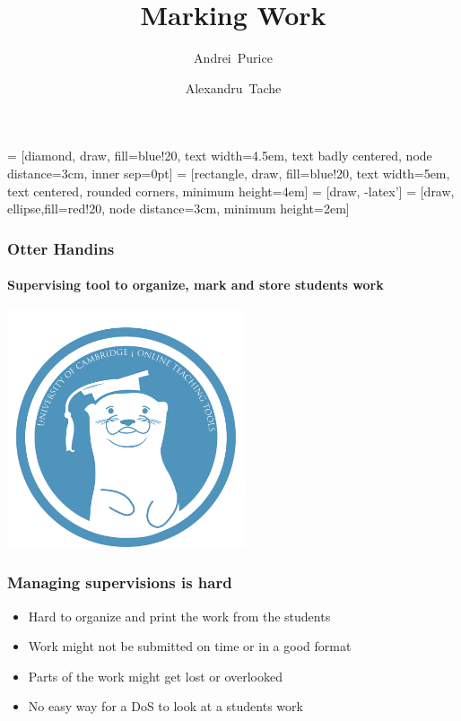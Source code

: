 \documentclass{beamer}
\title %
{Marking Work}
\author[Author, Anders] %
{Andrei~Purice \and Alexandru~Tache}
\begin{document}
   = [diamond, draw, fill=blue!20, 
      text width=4.5em, text badly centered, node distance=3cm, inner sep=0pt]
   = [rectangle, draw, fill=blue!20, 
      text width=5em, text centered, rounded corners, minimum height=4em]
   = [draw, -latex']
   = [draw, ellipse,fill=red!20, node distance=3cm,
      minimum height=2em]
	\begin{frame}
		\frametitle{Otter Handins}
    \framesubtitle{Supervising tool to organize, mark and store students work}
		\begin{center}	
		 \includegraphics[height=7cm]{otter.jpg}
		\end{center}
    \end{frame}
	\begin{frame}
    	\frametitle{Managing supervisions is hard}
 
   	   	\begin{itemize}
   	   		\item Hard to organize and print the work from the students
          \item Work might not be submitted on time or in a good format
   	   		\item Parts of the work might get lost or overlooked
   	   		\item No easy way for a DoS to look at a students work
  	   	 \end{itemize}	   	 
  	\end{frame}
  	
\end{document}
